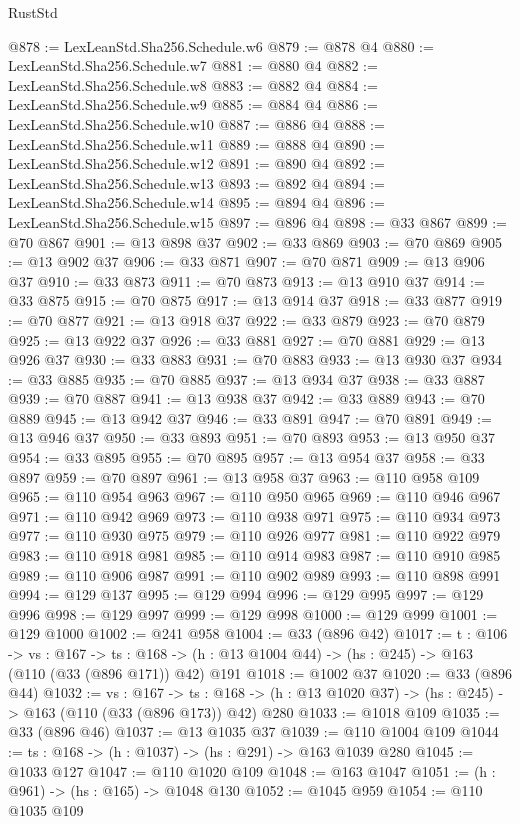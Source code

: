 \begin{lexlean}{RustStd}
\begin{coremodule}
{\begin{coremodule}
{{{@878 := LexLeanStd.Sha256.Schedule.w6
@879 := @878 @4
@880 := LexLeanStd.Sha256.Schedule.w7
@881 := @880 @4
@882 := LexLeanStd.Sha256.Schedule.w8
@883 := @882 @4
@884 := LexLeanStd.Sha256.Schedule.w9
@885 := @884 @4
@886 := LexLeanStd.Sha256.Schedule.w10
@887 := @886 @4
@888 := LexLeanStd.Sha256.Schedule.w11
@889 := @888 @4
@890 := LexLeanStd.Sha256.Schedule.w12
@891 := @890 @4
@892 := LexLeanStd.Sha256.Schedule.w13
@893 := @892 @4
@894 := LexLeanStd.Sha256.Schedule.w14
@895 := @894 @4
@896 := LexLeanStd.Sha256.Schedule.w15
@897 := @896 @4
@898 := @33 @867
@899 := @70 @867
@901 := @13 @898 @37
@902 := @33 @869
@903 := @70 @869
@905 := @13 @902 @37
@906 := @33 @871
@907 := @70 @871
@909 := @13 @906 @37
@910 := @33 @873
@911 := @70 @873
@913 := @13 @910 @37
@914 := @33 @875
@915 := @70 @875
@917 := @13 @914 @37
@918 := @33 @877
@919 := @70 @877
@921 := @13 @918 @37
@922 := @33 @879
@923 := @70 @879
@925 := @13 @922 @37
@926 := @33 @881
@927 := @70 @881
@929 := @13 @926 @37
@930 := @33 @883
@931 := @70 @883
@933 := @13 @930 @37
@934 := @33 @885
@935 := @70 @885
@937 := @13 @934 @37
@938 := @33 @887
@939 := @70 @887
@941 := @13 @938 @37
@942 := @33 @889
@943 := @70 @889
@945 := @13 @942 @37
@946 := @33 @891
@947 := @70 @891
@949 := @13 @946 @37
@950 := @33 @893
@951 := @70 @893
@953 := @13 @950 @37
@954 := @33 @895
@955 := @70 @895
@957 := @13 @954 @37
@958 := @33 @897
@959 := @70 @897
@961 := @13 @958 @37
@963 := @110 @958 @109
@965 := @110 @954 @963
@967 := @110 @950 @965
@969 := @110 @946 @967
@971 := @110 @942 @969
@973 := @110 @938 @971
@975 := @110 @934 @973
@977 := @110 @930 @975
@979 := @110 @926 @977
@981 := @110 @922 @979
@983 := @110 @918 @981
@985 := @110 @914 @983
@987 := @110 @910 @985
@989 := @110 @906 @987
@991 := @110 @902 @989
@993 := @110 @898 @991
@994 := @129 @137
@995 := @129 @994
@996 := @129 @995
@997 := @129 @996
@998 := @129 @997
@999 := @129 @998
@1000 := @129 @999
@1001 := @129 @1000
@1002 := @241 @958
@1004 := @33 (@896 @42)
@1017 := {t : @106} ->
  {vs : @167} ->
  {ts : @168} -> (h : @13 @1004 @44) -> (hs : @245) -> @163 (@110 (@33 (@896 @171)) @42) @191
@1018 := @1002 @37
@1020 := @33 (@896 @44)
@1032 := {vs : @167} ->
  {ts : @168} -> (h : @13 @1020 @37) -> (hs : @245) -> @163 (@110 (@33 (@896 @173)) @42) @280
@1033 := @1018 @109
@1035 := @33 (@896 @46)
@1037 := @13 @1035 @37
@1039 := @110 @1004 @109
@1044 := {ts : @168} -> (h : @1037) -> (hs : @291) -> @163 @1039 @280
@1045 := @1033 @127
@1047 := @110 @1020 @109
@1048 := @163 @1047
@1051 := (h : @961) -> (hs : @165) -> @1048 @130
@1052 := @1045 @959
@1054 := @110 @1035 @109
}}}
\end{coremodule}}
\end{coremodule}
\end{lexlean}
